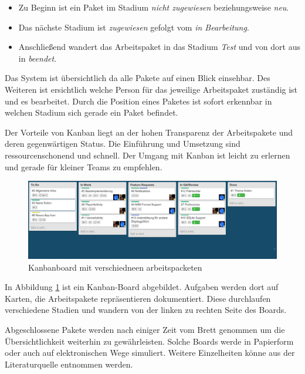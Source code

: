\begin{itemize}
	\item Zu Beginn ist ein Paket im Stadium \textit{nicht zugewiesen} beziehungsweise \textit{neu}.
	\item Das nächste Stadium ist \textit{zugewiesen} gefolgt vom \textit{in Bearbeitung}.
	\item Anschließend wandert das Arbeitspaket in das Stadium \textit{Test} und von dort aus in \textit{beendet}.
\end{itemize}

Das System ist übersichtlich da alle Pakete auf einen Blick einsehbar. Des Weiteren ist ersichtlich welche Person für das jeweilige Arbeitspaket zuständig ist und es bearbeitet. Durch die Position eines Paketes ist sofort erkennbar in welchen Stadium sich gerade ein Paket befindet.

Der Vorteile von Kanban liegt an der hohen Transparenz der Arbeitspakete und deren gegenwärtigen Status. Die Einführung und Umsetzung sind ressourcenschonend und schnell. Der Umgang mit Kanban ist leicht zu erlernen und gerade für kleiner Teams zu empfehlen.

\begin{figure}
\begin{center}
\includegraphics[scale=0.35]{images/kanban}
\caption{Kanbanboard mit verschiedneen arbeitspacketen}
\label{kanban}
\end{center}
\end{figure}

In Abbildung \ref{kanban} ist ein Kanban-Board abgebildet. Aufgaben werden dort auf Karten, die Arbeitspakete repräsentieren dokumentiert. Diese durchlaufen verschiedene Stadien und wandern von der linken zu rechten Seite des Boards.

Abgeschlossene Pakete werden nach einiger Zeit vom Brett genommen um die Übersichtlichkeit weiterhin zu gewährleisten. Solche Boards werde in Papierform oder auch auf elektronischen Wege simuliert. Weitere Einzelheiten könne aus der Literaturquelle \cite{9783898647304} entnommen werden.

